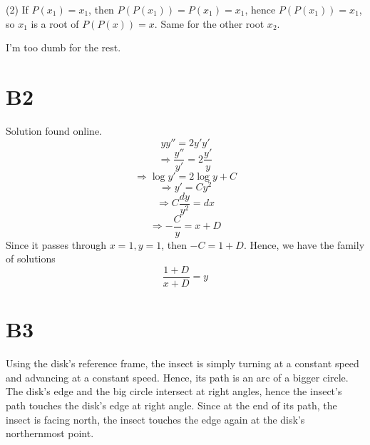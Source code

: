 \documentclass{book}
\begin{document}
\noindent
(2)
If $P(x_1) = x_1$, then $P(P(x_1)) = P(x_1) = x_1$, hence $P(P(x_1)) = x_1$, so $x_1$ is a root of $P(P(x)) = x$. Same for the other root $x_2$.

I'm too dumb for the rest.

\section*{B2}
Solution found online.
$$yy'' = 2y'y'$$
$$\Rightarrow \frac{y''}{y'} = 2\frac{y'}{y}$$
$$\Rightarrow \log y' = 2 \log y + C$$
$$\Rightarrow y' = Cy^2$$
$$\Rightarrow C\frac{dy}{y^2} = dx$$
$$\Rightarrow -\frac{C}{y} = x + D$$
Since it passes through $x = 1, y = 1$, then $-C = 1 + D$. Hence, we have the family of solutions
$$\frac{1 + D}{x + D} = y$$

\section*{B3}
Using the disk's reference frame, the insect is simply turning at a constant speed and advancing at a constant speed. Hence, its path is an arc of a bigger circle. The disk's edge and the big circle intersect at right angles, hence the insect's path touches the disk's edge at right angle. Since at the end of its path, the insect is facing north, the insect touches the edge again at the disk's northernmost point.
\end{document}
